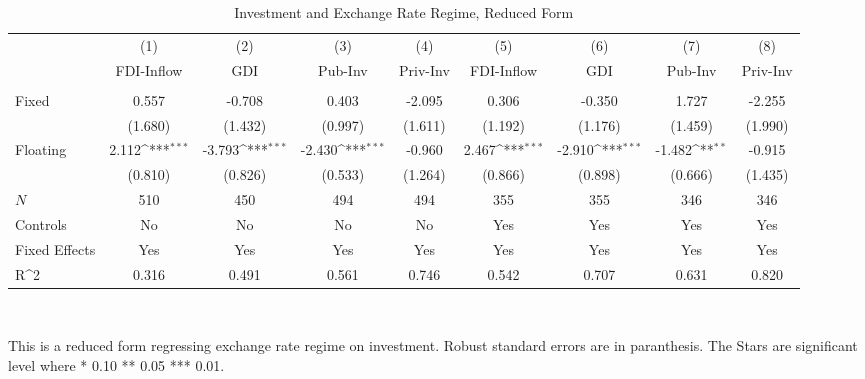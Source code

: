 \begin{table}[H] \def\sym#1{\ifmmode^{#1}\else\(^{#1}\)\fi} \caption{Investment and Exchange Rate Regime, Reduced Form} \begin{adjustbox}{max width=\textwidth} \begin{tabular}{l*{8}{c}} \\ \hline\hline
            &\multicolumn{1}{c}{(1)}&\multicolumn{1}{c}{(2)}&\multicolumn{1}{c}{(3)}&\multicolumn{1}{c}{(4)}&\multicolumn{1}{c}{(5)}&\multicolumn{1}{c}{(6)}&\multicolumn{1}{c}{(7)}&\multicolumn{1}{c}{(8)}\\
            &\multicolumn{1}{c}{FDI-Inflow}&\multicolumn{1}{c}{GDI}&\multicolumn{1}{c}{Pub-Inv}&\multicolumn{1}{c}{Priv-Inv}&\multicolumn{1}{c}{FDI-Inflow}&\multicolumn{1}{c}{GDI}&\multicolumn{1}{c}{Pub-Inv}&\multicolumn{1}{c}{Priv-Inv}\\
\hline \addlinespace \multicolumn{8}{l}{} \\  \addlinespace[2pt]
Fixed       &       0.557         &      -0.708         &       0.403         &      -2.095         &       0.306         &      -0.350         &       1.727         &      -2.255         \\
            &     (1.680)         &     (1.432)         &     (0.997)         &     (1.611)         &     (1.192)         &     (1.176)         &     (1.459)         &     (1.990)         \\
\addlinespace
Floating    &       2.112\sym{***}&      -3.793\sym{***}&      -2.430\sym{***}&      -0.960         &       2.467\sym{***}&      -2.910\sym{***}&      -1.482\sym{**} &      -0.915         \\
            &     (0.810)         &     (0.826)         &     (0.533)         &     (1.264)         &     (0.866)         &     (0.898)         &     (0.666)         &     (1.435)         \\
\midrule
\(N\)       &         510         &         450         &         494         &         494         &         355         &         355         &         346         &         346         \\
Controls    &          No         &          No         &          No         &          No         &         Yes         &         Yes         &         Yes         &         Yes         \\
Fixed Effects&         Yes         &         Yes         &         Yes         &         Yes         &         Yes         &         Yes         &         Yes         &         Yes         \\
R^{2}       &       0.316         &       0.491         &       0.561         &       0.746         &       0.542         &       0.707         &       0.631         &       0.820         \\
\bottomrule \end{tabular} \end{adjustbox} \\         \footnotesize \item This is a reduced form regressing exchange rate regime on investment. Robust standard errors are in paranthesis. The Stars are significant level where * 0.10 ** 0.05 *** 0.01. \end{table}
